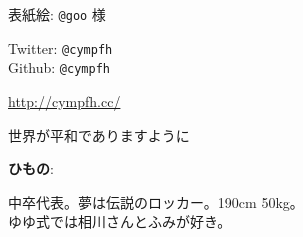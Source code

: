 \vspace*{40mm}
\begin{minipage}{0.8\paperwidth}
    表紙絵: {\tt @goo} 様
\end{minipage}

\vspace*{20mm}
\begin{minipage}{0.8\paperwidth}
    Twitter: {\tt @cympfh}\\
    Github: {\tt @cympfh}

    {\url{http://cympfh.cc/}}

    世界が平和でありますように
\end{minipage}

\vspace*{20mm}
\begin{minipage}{0.8\paperwidth}
    {\bf ひもの}:

    中卒代表。夢は伝説のロッカー。190cm 50kg。\\
    ゆゆ式では相川さんとふみが好き。
\end{minipage}
